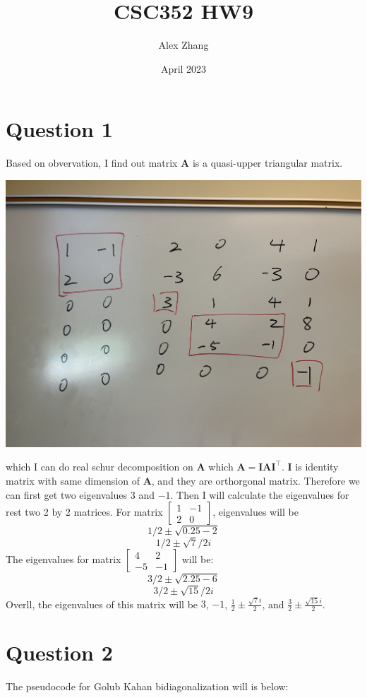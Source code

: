 \documentclass{article}
\title{CSC352 HW9}
\author{Alex Zhang}
\date{April 2023}
\newcommand{\bmat}[1]{\begin{bmatrix} #1 \end{bmatrix}}
\newcommand{\mat}[1]{\mathbf{#1}}
\begin{document}
\maketitle
\section*{Question 1}
Based on obvervation, I find out matrix $\mat{A}$ is a quasi-upper triangular matrix.
\begin{center}
    \includegraphics[scale = 0.2]{quasi.jpg}
\end{center}
which I can do real schur decomposition on $\mat{A}$ which $\mat{A} = \mat{I}\mat{A}\mat{I}^\top$.
$\mat{I}$ is identity matrix with same dimension of $\mat{A}$, and they are orthorgonal matrix. Therefore we can first get 
two eigenvalues $3$ and $-1$. Then I will calculate the eigenvalues for rest two 2 by 2 matrices. For matrix $\bmat{1 & -1 \\2 & 0}$,
eigenvalues will be 
$$1/2 \pm \sqrt{0.25 - 2}$$
$$1/2 \pm \sqrt{7} / 2i$$
The eigenvalues for matrix $\bmat{4 & 2 \\ -5 & -1}$ will be:
$$3/2 \pm \sqrt{2.25 - 6}$$
$$3/2 \pm \sqrt{15}/2i$$
Overll, the eigenvalues of this matrix will be $3$, $-1$, $\frac{1}{2} \pm \frac{\sqrt{7}i}{2}$, and $\frac{3}{2} \pm \frac{\sqrt{15}i}{2}$.


\section*{Question 2}
The pseudocode for Golub Kahan bidiagonalization will is below:
\end{document}
